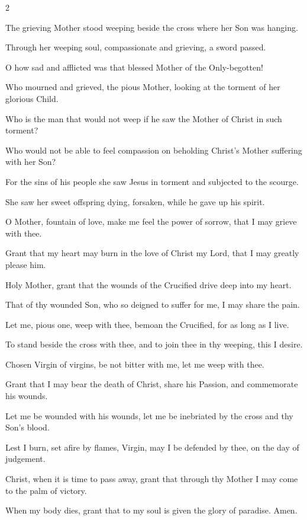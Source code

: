 \begin{multicols}{2}
\raggedcolumns
\begin{enpars}
The grieving Mother stood weeping beside the cross where her Son was hanging.

Through her weeping soul, compassionate and grieving, a sword passed.

O how sad and afflicted was that blessed Mother of the Only-begotten!

Who mourned and grieved, the pious Mother, looking at the torment of her glorious Child.

Who is the man that would not weep if he saw the Mother of Christ in such torment?

Who would not be able to feel compassion on beholding Christ’s Mother suffering with her Son?

For the sins of his people she saw Jesus in torment and subjected to the scourge.

She saw her sweet offspring dying, forsaken, while he gave up his spirit.

O Mother, fountain of love, make me feel the power of sorrow, that I may grieve with thee.

Grant that my heart may burn in the love of Christ my Lord, that I may greatly please him.

Holy Mother, grant that the wounds of the Crucified drive deep into my heart.

That of thy wounded Son, who so deigned to suffer for me, I may share the pain.

Let me, pious one, weep with thee, bemoan the Crucified, for as long as I live.

To stand beside the cross with thee, and to join thee in thy weeping, this I desire.

Chosen Virgin of virgins, be not bitter with me, let me weep with thee.

Grant that I may bear the death of Christ, share his Passion, and commemorate his wounds.

Let me be wounded with his wounds, let me be inebriated by the cross and thy Son’s blood.

Lest I burn, set afire by flames, Virgin, may I be defended by thee, on the day of judgement.

Christ, when it is time to pass away, grant that through thy Mother I may come to the palm of victory.

When my body dies, grant that to my soul is given the glory of paradise. Amen.
\end{enpars}\end{multicols}